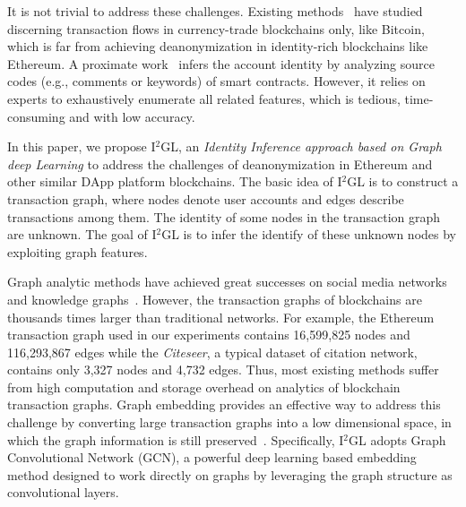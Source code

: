 It is not trivial to address these challenges. Existing methods~\cite{maesa2016analysis,ranshous2017exchange,zhao2015graph} have studied discerning transaction flows in currency-trade blockchains only, like Bitcoin, which is far from achieving deanonymization in identity-rich blockchains like Ethereum. A proximate work~\cite{chen2018infocom} infers the account identity by analyzing source codes (e.g., comments or keywords) of smart contracts. However, it relies on experts to exhaustively enumerate all related features, which is tedious, time-consuming and with low accuracy.


In this paper, we propose I$^2$GL, an \textit{Identity Inference approach based on Graph deep Learning} to address the challenges of deanonymization in Ethereum and other similar DApp platform blockchains. The basic idea of I$^2$GL is to construct a transaction graph, where nodes denote user accounts and edges describe transactions among them. The identity of some nodes in the transaction graph are unknown. The goal of I$^2$GL is to infer the identify of these unknown nodes by exploiting graph features.

Graph analytic methods have achieved great successes on social media networks~\cite{geng2015learning} and knowledge graphs~\cite{bollacker2008freebase}. However, the transaction graphs of blockchains are thousands times larger than traditional networks. For example, the Ethereum transaction graph used in our experiments contains 16,599,825 nodes and 116,293,867 edges while the \emph{Citeseer}, a typical dataset of citation network, contains only 3,327 nodes and 4,732 edges. Thus, most existing methods suffer from high computation and storage overhead on analytics of blockchain transaction graphs. Graph embedding provides an effective way to address this challenge by converting large transaction graphs into a low dimensional space, in which the graph information is still preserved~\cite{hamilton2017representation}.
Specifically, I$^2$GL adopts Graph Convolutional Network (GCN), a powerful deep learning based embedding method designed to work directly on graphs by leveraging the graph structure as convolutional layers.

